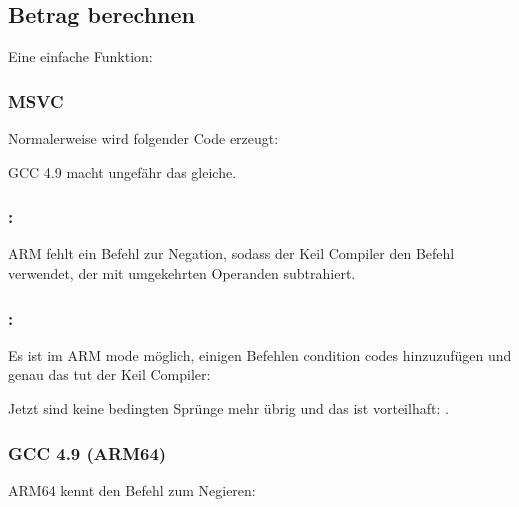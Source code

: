 \subsection{Betrag berechnen}
\label{sec:abs}

Eine einfache Funktion:



\subsubsection{\Optimizing MSVC}

Normalerweise wird folgender Code erzeugt:



GCC 4.9 macht ungefähr das gleiche.

\subsubsection{\OptimizingKeilVI: \ThumbMode}



ARM fehlt ein Befehl zur Negation, sodass der Keil Compiler den  Befehl verwendet, der mit umgekehrten Operanden subtrahiert.

\subsubsection{\OptimizingKeilVI: \ARMMode}
Es ist im ARM mode möglich, einigen Befehlen condition codes hinzuzufügen und genau das tut der Keil Compiler:


Jetzt sind keine bedingten Sprünge mehr übrig und das ist vorteilhaft: .

\subsubsection{\NonOptimizing GCC 4.9 (ARM64)}


ARM64 kennt den Befehl  zum Negieren:



